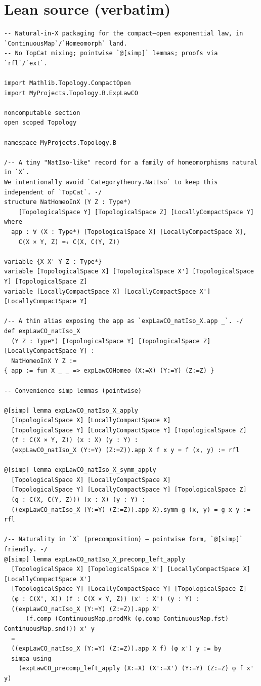 \documentclass[12pt]{article}
\begin{document}
\section*{Lean source (verbatim)}
\begin{lstlisting}
-- Natural-in-X packaging for the compact–open exponential law, in `ContinuousMap`/`Homeomorph` land.
-- No TopCat mixing; pointwise `@[simp]` lemmas; proofs via `rfl`/`ext`.

import Mathlib.Topology.CompactOpen
import MyProjects.Topology.B.ExpLawCO

noncomputable section
open scoped Topology

namespace MyProjects.Topology.B

/-- A tiny "NatIso-like" record for a family of homeomorphisms natural in `X`.
We intentionally avoid `CategoryTheory.NatIso` to keep this independent of `TopCat`. -/
structure NatHomeoInX (Y Z : Type*)
    [TopologicalSpace Y] [TopologicalSpace Z] [LocallyCompactSpace Y] where
  app : ∀ (X : Type*) [TopologicalSpace X] [LocallyCompactSpace X],
    C(X × Y, Z) ≃ₜ C(X, C(Y, Z))

variable {X X' Y Z : Type*}
variable [TopologicalSpace X] [TopologicalSpace X'] [TopologicalSpace Y] [TopologicalSpace Z]
variable [LocallyCompactSpace X] [LocallyCompactSpace X'] [LocallyCompactSpace Y]

/-- A thin alias exposing the app as `expLawCO_natIso_X.app _`. -/
def expLawCO_natIso_X
  (Y Z : Type*) [TopologicalSpace Y] [TopologicalSpace Z] [LocallyCompactSpace Y] :
  NatHomeoInX Y Z :=
{ app := fun X _ _ => expLawCOHomeo (X:=X) (Y:=Y) (Z:=Z) }

-- Convenience simp lemmas (pointwise)

@[simp] lemma expLawCO_natIso_X_apply
  [TopologicalSpace X] [LocallyCompactSpace X]
  [TopologicalSpace Y] [LocallyCompactSpace Y] [TopologicalSpace Z]
  (f : C(X × Y, Z)) (x : X) (y : Y) :
  (expLawCO_natIso_X (Y:=Y) (Z:=Z)).app X f x y = f (x, y) := rfl

@[simp] lemma expLawCO_natIso_X_symm_apply
  [TopologicalSpace X] [LocallyCompactSpace X]
  [TopologicalSpace Y] [LocallyCompactSpace Y] [TopologicalSpace Z]
  (g : C(X, C(Y, Z))) (x : X) (y : Y) :
  ((expLawCO_natIso_X (Y:=Y) (Z:=Z)).app X).symm g (x, y) = g x y := rfl

/-- Naturality in `X` (precomposition) — pointwise form, `@[simp]` friendly. -/
@[simp] lemma expLawCO_natIso_X_precomp_left_apply
  [TopologicalSpace X] [TopologicalSpace X'] [LocallyCompactSpace X] [LocallyCompactSpace X']
  [TopologicalSpace Y] [LocallyCompactSpace Y] [TopologicalSpace Z]
  (φ : C(X', X)) (f : C(X × Y, Z)) (x' : X') (y : Y) :
  ((expLawCO_natIso_X (Y:=Y) (Z:=Z)).app X'
      (f.comp (ContinuousMap.prodMk (φ.comp ContinuousMap.fst) ContinuousMap.snd))) x' y
  =
  ((expLawCO_natIso_X (Y:=Y) (Z:=Z)).app X f) (φ x') y := by
  simpa using
    (expLawCO_precomp_left_apply (X:=X) (X':=X') (Y:=Y) (Z:=Z) φ f x' y)


\end{lstlisting}
\end{document}
